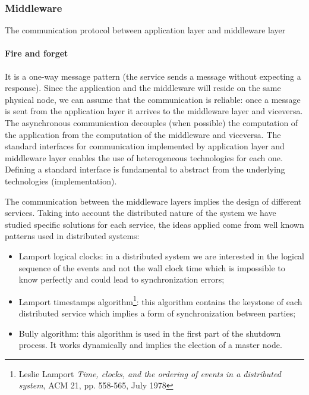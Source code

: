 \subsubsection{Middleware}
The communication protocol between application layer and middleware layer
\paragraph{Fire and forget}
It is a one-way message pattern (the service sends a message without expecting
a response). Since the application and the middleware will reside on the same
physical node, we can assume that the communication is reliable: once a message
is sent from the application layer it arrives to the middleware layer and
viceversa. The asynchronous communication decouples (when possible)
the computation of the application from the computation of the middleware
and viceversa. The standard interfaces for communication
implemented by application layer and middleware layer enables the use of
heterogeneous technologies for each one. Defining a standard interface
is fundamental to abstract from the underlying technologies (implementation).


The communication between the middleware layers implies the design of different
services. Taking into account the distributed nature of the system we have
studied specific solutions for each service, the ideas applied come from
well known patterns used in distributed systems:
\begin{itemize}
\item Lamport logical clocks: in a distributed system we are interested
  in the logical sequence of the events and not the wall clock time which is
  impossible to know perfectly and could lead to synchronization errors;
\item Lamport timestamps algorithm\footnote{Leslie Lamport \textit{Time,
  clocks, and the ordering of events in a distributed system}, ACM 21,
  pp. 558-565, July 1978}: this algorithm contains the keystone
  of each distributed service which implies a form of synchronization
  between parties;
\item Bully algorithm: this algorithm is used in the first part of the
  shutdown process. It works dynamically and implies the election of a master
  node.
\end{itemize}

